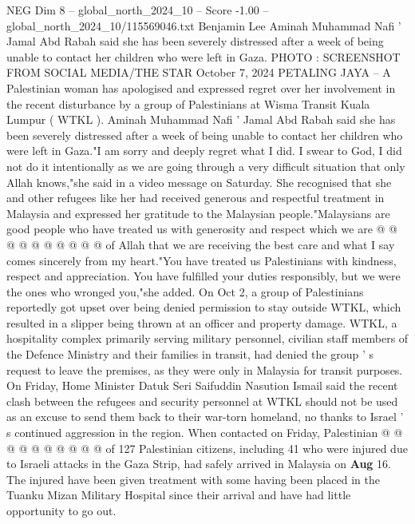 \begin{textsample}{NEG Dim 8 – global\_north\_2024\_10 – Score -1.00 – global\_north\_2024\_10/115569046.txt}  \label{ex:f8_neg_202}
Benjamin Lee Aminah Muhammad Nafi ' Jamal Abd Rabah said she has been severely distressed after a week of being unable to contact her children who were left in Gaza.
PHOTO : SCREENSHOT FROM SOCIAL MEDIA/THE STAR October 7, 2024 PETALING JAYA -- A Palestinian woman has apologised and expressed regret over her involvement in the recent disturbance by a group of Palestinians at Wisma Transit Kuala Lumpur ( WTKL ).
Aminah Muhammad Nafi ' Jamal Abd Rabah said she has been severely distressed after a week of being unable to contact her children who were left in Gaza."I am sorry and deeply regret what I did.
I swear to God, I did not do it intentionally as we are going through a very difficult situation that only Allah knows,"she said in a video message on Saturday.
She recognised that she and other refugees like her had received generous and respectful treatment in Malaysia and expressed her gratitude to the Malaysian people."Malaysians are good people who have treated us with generosity and respect which we are @ @ @ @ @ @ @ @ @ @ of Allah that we are receiving the best care and what I say comes sincerely from my heart."You have treated us Palestinians with kindness, respect and appreciation.
You have fulfilled your duties responsibly, but we were the ones who wronged you,"she added.
On Oct 2, a group of Palestinians reportedly got upset over being denied permission to stay outside WTKL, which resulted in a slipper being thrown at an officer and property damage.
WTKL, a hospitality complex primarily serving military personnel, civilian staff members of the Defence Ministry and their families in transit, had denied the group ' s request to leave the premises, as they were only in Malaysia for transit purposes.
On Friday, Home Minister Datuk Seri Saifuddin Nasution Ismail said the recent clash between the refugees and security personnel at WTKL should not be used as an excuse to send them back to their war-torn homeland, no thanks to Israel ' s continued aggression in the region.
When contacted on Friday, Palestinian @ @ @ @ @ @ @ @ @ @ of 127 Palestinian citizens, including 41 who were injured due to Israeli attacks in the Gaza Strip, had safely arrived in Malaysia on \textbf{Aug} 16.
The injured have been given treatment with some having been placed in the Tuanku Mizan Military Hospital since their arrival and have had little opportunity to go out.

\end{textsample}
